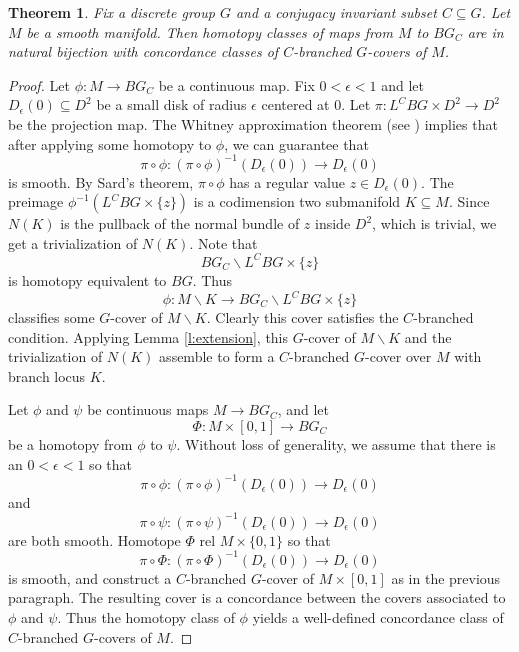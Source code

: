 \documentclass[10pt,twocolumn,amsmath,amssymb,aps,pra,secnumarabic,
    nofootinbib,groupedaddress]{revtex4-1}
\newtheorem{theorem}{Theorem}[section]
\renewcommand{\setminus}{\smallsetminus}
\newcommand{\e}{\epsilon}
\begin{document}
\begin{theorem}
Fix a discrete group $G$ and a conjugacy invariant subset $C \subseteq G$.  Let $M$ be a smooth manifold.  Then homotopy classes of maps from $M$ to $BG_C$ are in natural bijection with concordance classes of $C$-branched $G$-covers of $M$.
\label{th:brand}
\end{theorem}

\begin{proof}
Let $\phi: M \to BG_C$ be a continuous map.  Fix $0<\e<1$ and let $D_\e(0) \subseteq D^2$ be a small disk of radius $\e$ centered at $0$.   Let $\pi: L^CBG \times D^2 \to D^2$ be the projection map.  The Whitney approximation theorem (see \cite[Thm.~6.19]{Lee:smooth}) implies that after applying some homotopy to $\phi$, we can guarantee that
\[ \pi\circ\phi: (\pi\circ\phi)^{-1}(D_\e(0))  \to D_\e(0) \]
is smooth.  By Sard's theorem, $\pi\circ\phi$ has a regular value $z \in D_\e(0)$.  The preimage $\phi^{-1}(L^CBG \times \{z\})$ is a codimension two submanifold $K \subseteq M$.  Since $N(K)$ is the pullback of the normal bundle of $z$ inside $D^2$, which is trivial, we get a trivialization of $N(K)$.  Note that 
\[ BG_C \setminus L^CBG \times \{z\} \]
is homotopy equivalent to $BG$.  Thus
\[ \phi: M \setminus K \to BG_C \setminus L^CBG \times \{z\} \]
classifies some $G$-cover of $M \setminus K$.  Clearly this cover satisfies the $C$-branched condition.  Applying Lemma \ref{l:extension}, this $G$-cover of $M \setminus K$ and the trivialization of $N(K)$ assemble to form a $C$-branched $G$-cover over $M$ with branch locus $K$.

Let $\phi$ and $\psi$ be continuous maps $M \to BG_C$, and let
\[ \Phi: M \times [0,1] \to BG_C \]
be a homotopy from $\phi$ to $\psi$.  Without loss of generality, we assume that there is an $0<\e<1$ so that
\[ \pi\circ\phi: (\pi\circ\phi)^{-1}(D_\e(0))  \to D_\e(0) \]
and
\[ \pi\circ\psi: (\pi\circ\psi)^{-1}(D_\e(0))  \to D_\e(0) \]
are both smooth.  Homotope $\Phi$ rel $M \times \{0,1\}$ so that
\[ \pi\circ\Phi: (\pi\circ\Phi)^{-1}(D_\e(0))  \to D_\e(0) \]
is smooth, and construct a $C$-branched $G$-cover of $M \times [0,1]$ as in the previous paragraph.  The resulting cover is a concordance between the covers associated to $\phi$ and $\psi$.  Thus the homotopy class of $\phi$ yields a well-defined concordance class of $C$-branched $G$-covers of $M$.


\end{proof}
\end{document}
